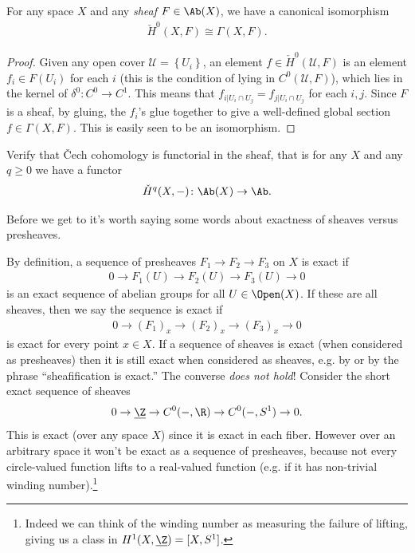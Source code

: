 \documentclass[11pt]{amsart}
\begin{document}
\begin{proposition}\label{prop:Cech-0-is-global-sections} 
For any space $X$ and any \emph{sheaf} $F\in\Ab(X)$, we have a canonical isomorphism
\begin{align*}
    \check{H}^0(X,F) \cong \Gamma(X,F).
\end{align*}
\end{proposition}
\begin{proof} Given any open cover $\mathcal{U} = \left\{ U_i \right\}$, an element $f \in \check{H}^0(\mathcal{U},F)$ is an element $f_i \in F(U_i)$ for each $i$ (this is the condition of lying in $C^0(\mathcal{U},F)$), which lies in the kernel of $\delta^0 \colon C^0 \to C^1$. This means that $f_{i|U_i\cap U_j} = f_{j|U_i\cap U_j}$ for each $i,j$. Since $F$ is a sheaf, by gluing, the $f_i$'s glue together to give a well-defined global section $f\in \Gamma(X,F)$. This is easily seen to be an isomorphism.
\end{proof}

\begin{exercise} Verify that \v{C}ech cohomology is functorial in the sheaf, that is for any $X$ and any $q\ge 0$ we have a functor
\begin{align*}
    \check{H}^q(X,-) \colon \Ab(X) \to \Ab.
\end{align*}
\end{exercise}

Before we get to  it's worth saying some words about exactness of sheaves versus presheaves.

\begin{remark}[On exactness] By definition, a sequence of presheaves $F_1\to F_2 \to F_3$ on $X$ is exact if
\begin{align*}
    0 \to F_1(U) \to F_2(U) \to F_3(U) \to 0
\end{align*}
is an exact sequence of abelian groups for all $U \in \Open(X)$. If these are all sheaves, then we say the sequence is exact if
\begin{align*}
    0 \to (F_1)_x \to (F_2)_x \to (F_3)_x \to 0
\end{align*}
is exact for every point $x\in X$. If a sequence of sheaves is exact (when considered as presheaves) then it is still exact when considered as sheaves, e.g. by  or by the phrase ``sheafification is exact.'' The converse \emph{does not hold}! Consider the short exact sequence of sheaves
\begin{align*}
    0 \to \underline{\Z} \to C^0(-,\R) \to C^0(-,S^1) \to 0.
\end{align*}
This is exact (over any space $X$) since it is exact in each fiber. However over an arbitrary space it won't be exact as a sequence of presheaves, because not every circle-valued function lifts to a real-valued function (e.g. if it has non-trivial winding number).\footnote{Indeed we can think of the winding number as measuring the failure of lifting, giving us a class in $H^1(X,\underline{\Z}) = [X,S^1]$.}
\end{remark}
\end{document}
